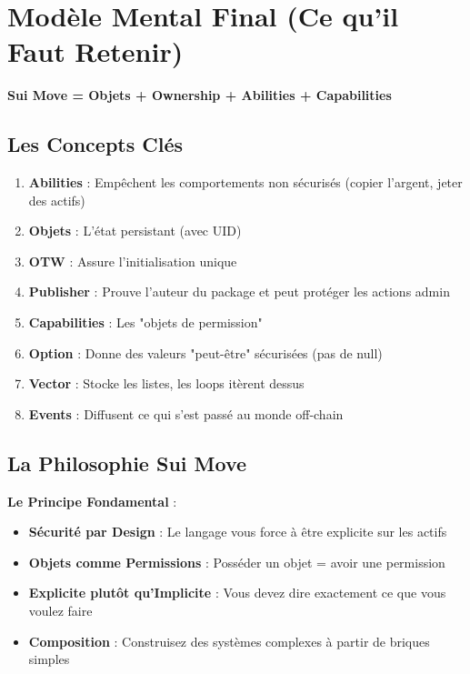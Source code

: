 \documentclass[11pt]{article}
\begin{document}
\section{Modèle Mental Final (Ce qu'il Faut Retenir)}

\begin{center}
\Large\textbf{Sui Move = Objets + Ownership + Abilities + Capabilities}
\end{center}

\subsection{Les Concepts Clés}

\begin{enumerate}
  \item \textbf{Abilities} : Empêchent les comportements non sécurisés (copier l'argent, jeter des actifs)
  
  \item \textbf{Objets} : L'état persistant (avec UID)
  
  \item \textbf{OTW} : Assure l'initialisation unique
  
  \item \textbf{Publisher} : Prouve l'auteur du package et peut protéger les actions admin
  
  \item \textbf{Capabilities} : Les "objets de permission"
  
  \item \textbf{Option} : Donne des valeurs "peut-être" sécurisées (pas de null)
  
  \item \textbf{Vector} : Stocke les listes, les loops itèrent dessus
  
  \item \textbf{Events} : Diffusent ce qui s'est passé au monde off-chain
\end{enumerate}

\subsection{La Philosophie Sui Move}

\begin{noteBox}
\textbf{Le Principe Fondamental} :
\begin{itemize}
  \item \textbf{Sécurité par Design} : Le langage vous force à être explicite sur les actifs
  \item \textbf{Objets comme Permissions} : Posséder un objet = avoir une permission
  \item \textbf{Explicite plutôt qu'Implicite} : Vous devez dire exactement ce que vous voulez faire
  \item \textbf{Composition} : Construisez des systèmes complexes à partir de briques simples
\end{itemize}
\end{noteBox}
\end{document}
